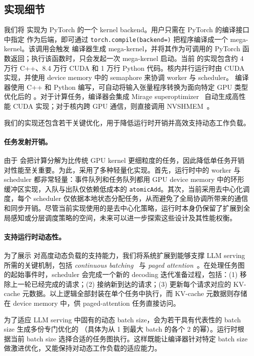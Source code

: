 \subsection{实现细节}
\label{sec:impl}

我们将 \sys 实现为 PyTorch 的一个 kernel backend。用户只需在 PyTorch 的编译接口中指定 \sys 作为后端，即可通过 {\tt torch.compile(backend=\sys)} 把程序编译成一个 \sys mega-kernel。该调用会触发 \sys 编译器生成 mega-kernel，并将其作为可调用的 PyTorch 函数返回；执行该函数时，只会发起一次 mega-kernel 启动。当前 \sys 的实现包含约 4 万行 C++、8.4 万行 CUDA 和 1 万行 Python 代码。核内并行运行时由 CUDA 实现，并使用 device memory 中的 semaphore 来协调 worker 与 scheduler。 \sys 编译器使用 C++ 和 Python 编写，可自动将输入张量程序转换为面向特定 GPU 类型优化后的 \graph。对于计算任务，编译器会集成 Mirage superoptimizer~\cite{wu2025mirage} 自动生成高性能 CUDA 实现；对于核内跨 GPU 通信，则直接调用 NVSHMEM~\cite{nvshmem}。

我们的实现还包含若干关键优化，用于降低运行时开销并高效支持动态工作负载。

\paragraph{任务发射开销。}
由于 \sys 会把计算分解为比传统 GPU kernel 更细粒度的任务，因此降低单任务开销对性能至关重要。为此，\sys 采用了多种轻量化实现。首先，运行时中的 worker 与 scheduler 都非常轻量：事件队列和任务队列都用 GPU device memory 中的环形缓冲区实现，入队与出队仅依赖低成本的 {\tt atomicAdd}。其次，\sys 当前采用去中心化调度，每个 scheduler 仅依据本地状态分配任务，从而避免了全局协调所带来的通信和同步开销。尽管当前实现使用的是去中心化策略，运行时本身仍保留了扩展到全局感知或分层调度策略的空间，未来可以进一步探索这些设计及其性能权衡。

\paragraph{支持运行时动态性。}
为了展示 \sys 对高度动态负载的支持能力，我们将系统扩展到能够支撑 LLM serving 所需的关键机制，包括 {\em continuous batching}~\cite{yu2022orca} 与 {\em paged attention}~\cite{kwon2023vllm}。在处理任务图的起始事件时，scheduler 会完成一个新的 decoding 迭代准备过程，包括：(1) 移除上一轮已经完成的请求；(2) 接纳新到达的请求；(3) 更新每个请求对应的 KV-cache 元数据。以上逻辑全部封装在单个任务中执行，而 KV-cache 元数据则存储在 device memory 中，供 paged-attention 任务直接访问。

为了适应 LLM serving 中固有的动态 batch size，\sys 会为若干具有代表性的 batch size 生成多份专门优化的 \graph（具体为从 1 到最大 batch 的各个 2 的幂）。运行时根据当前 batch size 选择合适的任务图执行。这样既能让编译器针对特定 batch size 做激进优化，又能保持对动态工作负载的适应能力。
